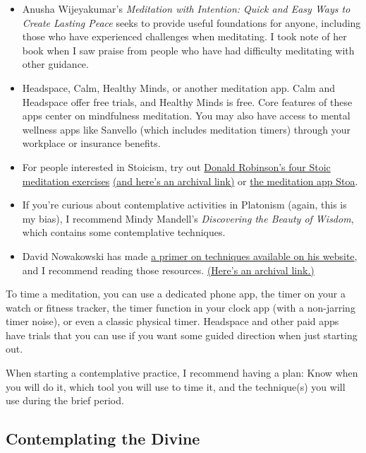 \documentclass[
]{book}
\providecommand{\tightlist}{%
  \setlength{\itemsep}{0pt}\setlength{\parskip}{0pt}}
\begin{document}
\begin{itemize}
\tightlist
\item
  Anusha Wijeyakumar's \emph{Meditation with Intention: Quick and Easy Ways to Create Lasting Peace} seeks to provide useful foundations for anyone, including those who have experienced challenges when meditating. I took note of her book when I saw praise from people who have had difficulty meditating with other guidance.
\item
  Headspace, Calm, Healthy Minds, or another meditation app. Calm and Headspace offer free trials, and Healthy Minds is free. Core features of these apps center on mindfulness meditation. You may also have access to mental wellness apps like Sanvello (which includes meditation timers) through your workplace or insurance benefits.
\item
  For people interested in Stoicism, try out \href{https://donaldrobertson.name/2018/03/27/four-stoic-meditation-exercises/}{Donald Robinson's four Stoic meditation exercises} \href{https://web.archive.org/web/2021*/https://donaldrobertson.name/2018/03/27/four-stoic-meditation-exercises/}{(and here's an archival link)} or \href{https://stoameditation.com/}{the meditation app Stoa}.
\item
  If you're curious about contemplative activities in Platonism (again, this is my bias), I recommend Mindy Mandell's \emph{Discovering the Beauty of Wisdom}, which contains some contemplative techniques.
\item
  David Nowakowski has made \href{https://davidnowakowski.net/meditation/}{a primer on techniques available on his website}, and I recommend reading those resources. \href{https://web.archive.org/web/2021*/https://davidnowakowski.net/meditation/}{(Here's an archival link.)}
\end{itemize}

To time a meditation, you can use a dedicated phone app, the timer on your a watch or fitness tracker, the timer function in your clock app (with a non-jarring timer noise), or even a classic physical timer. Headspace and other paid apps have trials that you can use if you want some guided direction when just starting out.

When starting a contemplative practice, I recommend having a plan: Know when you will do it, which tool you will use to time it, and the technique(s) you will use during the brief period.

\hypertarget{contemplating-the-divine}{%
\subsection{Contemplating the Divine}\label{contemplating-the-divine}}
\end{document}
